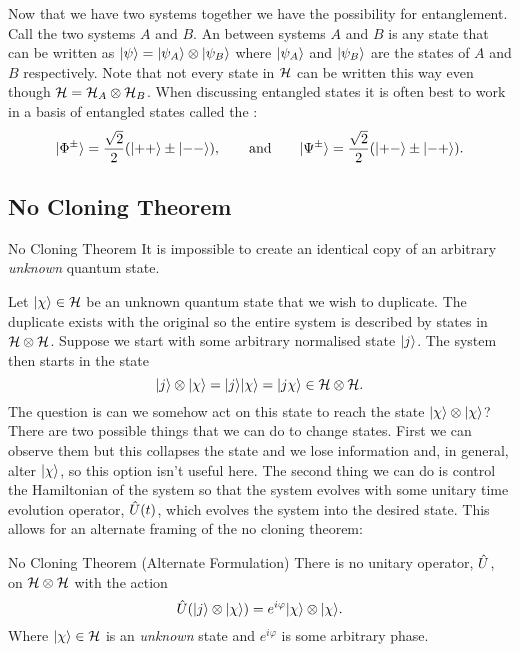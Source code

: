     Now that we have two systems together we have the possibility for entanglement.
    Call the two systems \(A\) and \(B\).
    An  between systems \(A\) and \(B\) is any state that can be written as \(\vert {\psi} \rangle = \vert {\psi_A} \rangle\otimes\vert {\psi_B} \rangle\) where \(\vert {\psi_A} \rangle\) and \(\vert {\psi_B} \rangle\) are the states of \(A\) and \(B\) respectively.
    Note that not every state in \(\mathcal{H}\) can be written this way even though \(\mathcal{H} = \mathcal{H}_A\otimes\mathcal{H}_B\).
    When discussing entangled states it is often best to work in a basis of entangled states called the :
    \[\vert {\Phi^{\pm}} \rangle = \frac{\sqrt{2}}{2}(\vert {++} \rangle \pm \vert {--} \rangle), \qquad\text{and}\qquad \vert {\Psi^{\pm}} \rangle = \frac{\sqrt{2}}{2}(\vert {+-} \rangle \pm \vert {-+} \rangle).\]
    
    \subsection{No Cloning Theorem}
    \begin{theorem}{No Cloning Theorem}{}
        It is impossible to create an identical copy of an arbitrary \emph{unknown} quantum state.
    \end{theorem}
    Let \(\vert {\chi} \rangle\in\mathcal{H}\) be an unknown quantum state that we wish to duplicate.
    The duplicate exists with the original so the entire system is described by states in \(\mathcal{H}\otimes\mathcal{H}\).
    Suppose we start with some arbitrary normalised state \(\vert {j} \rangle\).
    The system then starts in the state
    \[\vert {j} \rangle\otimes\vert {\chi} \rangle = \vert {j} \rangle\vert {\chi} \rangle = \vert {j\chi} \rangle \in\mathcal{H}\otimes\mathcal{H}.\]
    The question is can we somehow act on this state to reach the state \(\vert {\chi} \rangle\otimes\vert {\chi} \rangle\)?
    There are two possible things that we can do to change states.
    First we can observe them but this collapses the state and we lose information and, in general, alter \(\vert {\chi} \rangle\), so this option isn't useful here.
    The second thing we can do is control the Hamiltonian of the system so that the system evolves with some unitary time evolution operator, \(\hat{U}(t)\), which evolves the system into the desired state.
    This allows for an alternate framing of the no cloning theorem:
    \addtocounter{theoremCounter}{-1}
    \begin{theorem}{No Cloning Theorem (Alternate Formulation)}{}
        There is no unitary operator, \(\hat{U}\), on \(\mathcal{H}\otimes\mathcal{H}\) with the action
        \[\hat{U}(\vert {j} \rangle\otimes\vert {\chi} \rangle) = e^{i\varphi}\vert {\chi} \rangle\otimes\vert {\chi} \rangle.\]
        Where \(\vert {\chi} \rangle\in\mathcal{H}\) is an \emph{unknown} state and \(e^{i\varphi}\) is some arbitrary phase.
    \end{theorem}
